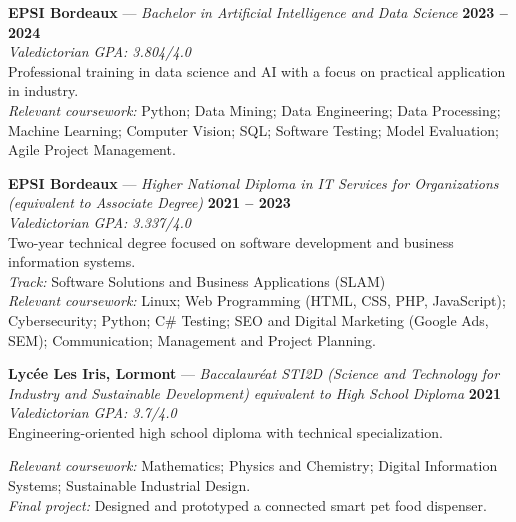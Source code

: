 \documentclass[10pt, letterpaper]{article}
\begin{document}
\vspace{0.3cm}

\textbf{EPSI Bordeaux} — \textit{Bachelor in Artificial Intelligence and Data Science} \hfill \textbf{2023 – 2024} \\
\textit{Valedictorian} \hfill \textit{GPA: 3.804/4.0} \\
Professional training in data science and AI with a focus on practical application in industry.\\
\textit{Relevant coursework:} Python; Data Mining; Data Engineering; Data Processing; Machine Learning; Computer Vision; SQL; Software Testing; Model Evaluation; Agile Project Management.

\vspace{0.3cm}

\textbf{EPSI Bordeaux} — \textit{Higher National Diploma in IT Services for Organizations (equivalent to Associate Degree) } \hfill \textbf{2021 – 2023} \\
\textit{Valedictorian} \hfill \textit{GPA: 3.337/4.0} \\
Two-year technical degree focused on software development and business information systems.\\
\textit{Track:} Software Solutions and Business Applications (SLAM)\\
\textit{Relevant coursework:} Linux; Web Programming (HTML, CSS, PHP, JavaScript); Cybersecurity; Python; C\# Testing; SEO and Digital Marketing (Google Ads, SEM); Communication; Management and Project Planning.

\vspace{0.3cm}


\textbf{Lycée Les Iris, Lormont} — \textit{Baccalauréat STI2D (Science and Technology for Industry and Sustainable Development) equivalent to High School Diploma} \hfill \textbf{2021} \\
\textit{Valedictorian} \hfill \textit{GPA: 3.7/4.0} \\
Engineering-oriented high school diploma with technical specialization.

\textit{Relevant coursework:} Mathematics; Physics and Chemistry; Digital Information Systems; Sustainable Industrial Design.\\
\textit{Final project:} Designed and prototyped a connected smart pet food dispenser.

\vspace{0.3cm}
\end{document}

